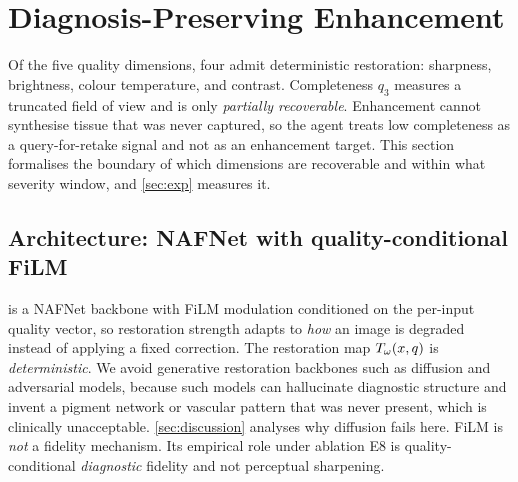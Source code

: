 
\section{Diagnosis-Preserving Enhancement}\label{sec:enhance}

Of the five quality dimensions, four admit deterministic restoration: sharpness, brightness, colour
temperature, and contrast. Completeness $q_3$ measures a truncated field of view and is only
\emph{partially recoverable}. Enhancement cannot synthesise tissue that was never captured, so the agent
treats low completeness as a query-for-retake signal and not as an enhancement target. This section
formalises the boundary of which dimensions are recoverable and within what severity window, and
\cref{sec:exp} measures it.

\subsection{Architecture: NAFNet with quality-conditional FiLM}\label{sec:arch}
\visienhance{} is a NAFNet backbone \citep{chen2022simple} with FiLM modulation \citep{perez2018film}
conditioned on the per-input quality vector, so restoration strength adapts to \emph{how} an image is
degraded instead of applying a fixed correction. The restoration map $T_\omega(x,q)$ is
\emph{deterministic}. We avoid generative restoration backbones such as diffusion and adversarial
models, because such models can hallucinate diagnostic structure and invent a pigment network or
vascular pattern that was never present, which is clinically unacceptable. \cref{sec:discussion}
analyses why diffusion fails here. FiLM is \emph{not} a fidelity mechanism. Its empirical role under
ablation E8 is quality-conditional \emph{diagnostic} fidelity and not perceptual sharpening.

